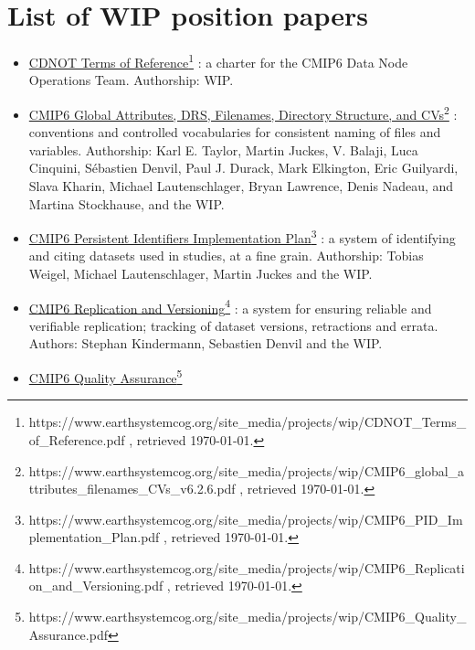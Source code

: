\documentclass[gmd,manuscript]{copernicus}
\begin{document}
\appendix

\section{List of WIP position papers}
\label{sec:wip}


\begin{itemize}
\item
  \href{https://www.earthsystemcog.org/site_media/projects/wip/CDNOT_Terms_of_Reference.pdf
  }{CDNOT Terms of
    Reference}\footnote{https://www.earthsystemcog.org/site\_media/projects/wip/CDNOT\_Terms\_of\_Reference.pdf
    , retrieved \today.} : a charter for the CMIP6 Data Node
  Operations Team. Authorship: WIP.
\item
  \href{https://www.earthsystemcog.org/site_media/projects/wip/CMIP6_global_attributes_filenames_CVs_v6.2.6.pdf
  }{CMIP6 Global Attributes, DRS, Filenames, Directory Structure, and
    CVs}\footnote{https://www.earthsystemcog.org/site\_media/projects/wip/CMIP6\_global\_attributes\_filenames\_CVs\_v6.2.6.pdf
    , retrieved \today.} : conventions and controlled vocabularies for
  consistent naming of files and variables. Authorship: Karl E.
  Taylor, Martin Juckes, V. Balaji, Luca Cinquini, Sébastien Denvil,
  Paul J. Durack, Mark Elkington, Eric Guilyardi, Slava Kharin,
  Michael Lautenschlager, Bryan Lawrence, Denis Nadeau, and Martina
  Stockhause, and the WIP.
\item
  \href{https://www.earthsystemcog.org/site_media/projects/wip/CMIP6_PID_Implementation_Plan.pdf
  }{CMIP6 Persistent Identifiers Implementation
    Plan}\footnote{https://www.earthsystemcog.org/site\_media/projects/wip/CMIP6\_PID\_Implementation\_Plan.pdf
    , retrieved \today.} : a system of identifying and citing datasets
  used in studies, at a fine grain. Authorship: Tobias Weigel, Michael
  Lautenschlager, Martin Juckes and the WIP.
\item
  \href{https://www.earthsystemcog.org/site_media/projects/wip/CMIP6_Replication_and_Versioning.pdf
  }{CMIP6 Replication and
    Versioning}\footnote{https://www.earthsystemcog.org/site\_media/projects/wip/CMIP6\_Replication\_and\_Versioning.pdf
    , retrieved \today.} : a system for ensuring reliable and
  verifiable replication; tracking of dataset versions, retractions
  and errata. Authors: Stephan Kindermann, Sebastien Denvil and the
  WIP.
\item
  \href{https://www.earthsystemcog.org/site_media/projects/wip/CMIP6_Quality_Assurance.pdf
  }{CMIP6 Quality
    Assurance}\footnote{https://www.earthsystemcog.org/site\_media/projects/wip/CMIP6\_Quality\_Assurance.pdf
}
\end{itemize}
\end{document}
